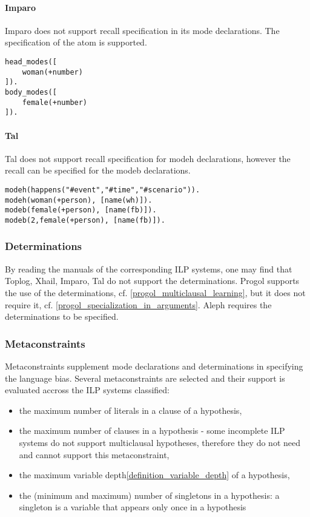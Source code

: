 \paragraph{Imparo}\cite{kimber2013imparo}
Imparo does not support recall specification in its mode declarations. The specification of the atom is supported.
\begin{exmp}
\begin{lstlisting}
head_modes([
    woman(+number)
]).
body_modes([
    female(+number)
]).
\end{lstlisting}
\end{exmp}

\paragraph{Tal}
Tal does not support recall specification for modeh declarations, however the recall can be specified for the modeb declarations\cite{corapi2011tal}.
\begin{exmp}
\begin{lstlisting}
modeh(happens("#event","#time","#scenario")).
modeh(woman(+person), [name(wh)]).
modeb(female(+person), [name(fb)]).
modeb(2,female(+person), [name(fb)]).
\end{lstlisting}
\end{exmp}

\subsubsection{Determinations}
By reading the manuals of the corresponding ILP systems, one may find that
Toplog, Xhail, Imparo, Tal do not support the determinations.
Progol supports the use of the determinations, cf. \ref{progol_multiclausal_learning}, but it does not require it, cf. \ref{progol_specialization_in_arguments}.
Aleph requires the determinations to be specified.

\subsubsection{Metaconstraints}
Metaconstraints supplement mode declarations and determinations in specifying the language bias. Several metaconstraints are selected and their support is evaluated accross the ILP systems classified:

\begin{itemize}
\item the maximum number of literals in a clause of a hypothesis,
\item the maximum number of clauses in a hypothesis - some incomplete ILP systems do not support multiclausal hypotheses, therefore they do not need and cannot support this metaconstraint,
\item the maximum variable depth\ref{definition_variable_depth} of a hypothesis,
\item the (minimum and maximum) number of singletons in a hypothesis:
a singleton is a variable that appears only once in a hypothesis\cite{santos2008toplogWebsite}
\end{itemize}

